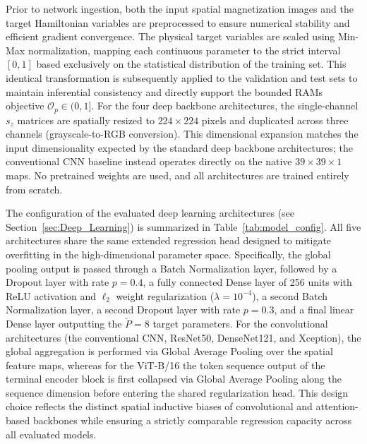 \documentclass[final,5p,times,twocolumn]{elsarticle}
\begin{document}
Prior to network ingestion, both the input spatial 
magnetization images and the target Hamiltonian 
variables are preprocessed to ensure numerical 
stability and efficient gradient convergence. The 
physical target variables are scaled using Min-Max 
normalization, mapping each continuous parameter to 
the strict interval $[0,1]$ based exclusively on the 
statistical distribution of the training set. This 
identical transformation is subsequently applied to 
the validation and test sets to maintain inferential 
consistency and directly support the bounded RAMs 
objective $\mathcal{O}_p \in (0,1]$. For the four deep backbone architectures, the single-channel $s_z$ 
matrices are spatially resized to $224 \times 224$ 
pixels and duplicated across three channels 
(grayscale-to-RGB conversion). This dimensional expansion matches the input dimensionality expected by the standard deep backbone architectures; the conventional CNN baseline instead operates directly on the native $39\times39\times1$ maps. No pretrained weights are used, and all architectures are trained entirely from scratch.

The configuration of the evaluated deep learning 
architectures (see Section~\ref{sec:Deep_Learning}) 
is summarized in Table~\ref{tab:model_config}. All five architectures share the same extended regression head designed 
to mitigate overfitting in the high-dimensional 
parameter space. Specifically, the global pooling 
output is passed through a Batch Normalization layer, 
followed by a Dropout layer with rate $p = 0.4$, a 
fully connected Dense layer of 256 units with ReLU 
activation and $\ell_2$ weight regularization 
($\lambda = 10^{-4}$), a second Batch Normalization 
layer, a second Dropout layer with rate $p = 0.3$, 
and a final linear Dense layer outputting the 
$\breve{P} = 8$ target parameters. For the convolutional architectures (the conventional CNN, ResNet50, DenseNet121, and Xception), the global aggregation is performed via 
Global Average Pooling over the spatial feature maps, 
whereas for the ViT-B/16 the token sequence output 
of the terminal encoder block is first collapsed via 
Global Average Pooling along the sequence dimension 
before entering the shared regularization head. This 
design choice reflects the distinct spatial inductive 
biases of convolutional and attention-based backbones 
while ensuring a strictly comparable regression 
capacity across all evaluated models.
\end{document}
